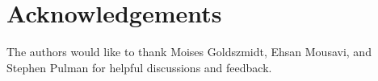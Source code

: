 \respace
\section*{Acknowledgements}
\respace
\label{sec:acknowledgments}

The authors would like to thank Moises Goldszmidt, Ehsan Mousavi, and Stephen Pulman for helpful discussions and feedback. 